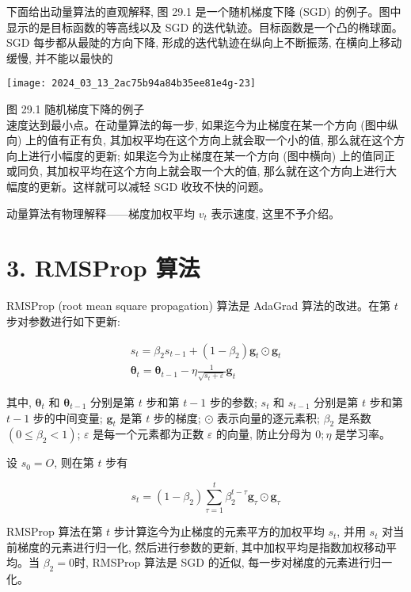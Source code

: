 \documentclass[10pt]{article}
\begin{document}
下面给出动量算法的直观解释, 图 29.1 是一个随机梯度下降 (SGD) 的例子。图中显示的是目标函数的等高线以及 SGD 的迭代轨迹。目标函数是一个凸的椭球面。SGD 每步都从最陡的方向下降, 形成的迭代轨迹在纵向上不断振荡, 在横向上移动缓慢, 并不能以最快的

\begin{center}
\texttt{[image: 2024\_03\_13\_2ac75b94a84b35ee81e4g-23]}
\end{center}

图 29.1 随机梯度下降的例子\\
速度达到最小点。在动量算法的每一步, 如果迄今为止梯度在某一个方向 (图中纵向) 上的值有正有负, 其加权平均在这个方向上就会取一个小的值, 那么就在这个方向上进行小幅度的更新; 如果迄今为止梯度在某一个方向 (图中横向) 上的值同正或同负, 其加权平均在这个方向上就会取一个大的值, 那么就在这个方向上进行大幅度的更新。这样就可以减轻 SGD 收玫不快的问题。

动量算法有物理解释——梯度加权平均 $v_{t}$ 表示速度, 这里不予介绍。

\section*{3. RMSProp 算法}
RMSProp (root mean square propagation) 算法是 AdaGrad 算法的改进。在第 $t$ 步对参数进行如下更新:


\begin{gather*}
s_{t}=\beta_{2} s_{t-1}+\left(1-\beta_{2}\right) \boldsymbol{g}_{t} \odot \boldsymbol{g}_{t}  \tag{29.5}\\
\boldsymbol{\theta}_{t}=\boldsymbol{\theta}_{t-1}-\eta \frac{1}{\sqrt{s_{t}+\varepsilon}} \boldsymbol{g}_{t} \tag{29.6}
\end{gather*}


其中, $\boldsymbol{\theta}_{t}$ 和 $\boldsymbol{\theta}_{t-1}$ 分别是第 $t$ 步和第 $t-1$ 步的参数; $s_{t}$ 和 $s_{t-1}$ 分别是第 $t$ 步和第 $t-1$ 步的中间变量; $\boldsymbol{g}_{t}$ 是第 $t$ 步的梯度; $\odot$ 表示向量的逐元素积; $\beta_{2}$ 是系数 $\left(0 \leqslant \beta_{2}<1\right)$; $\varepsilon$ 是每一个元素都为正数 $\varepsilon$ 的向量, 防止分母为 $0 ; \eta$ 是学习率。

设 $s_{0}=O$, 则在第 $t$ 步有


\begin{equation*}
s_{t}=\left(1-\beta_{2}\right) \sum_{\tau=1}^{t} \beta_{2}^{t-\tau} \boldsymbol{g}_{\tau} \odot \boldsymbol{g}_{\tau} \tag{29.7}
\end{equation*}


RMSProp 算法在第 $t$ 步计算迄今为止梯度的元素平方的加权平均 $s_{t}$, 并用 $s_{t}$ 对当前梯度的元素进行归一化, 然后进行参数的更新, 其中加权平均是指数加权移动平均。当 $\beta_{2}=0$时, RMSProp 算法是 SGD 的近似, 每一步对梯度的元素进行归一化。
\end{document}

